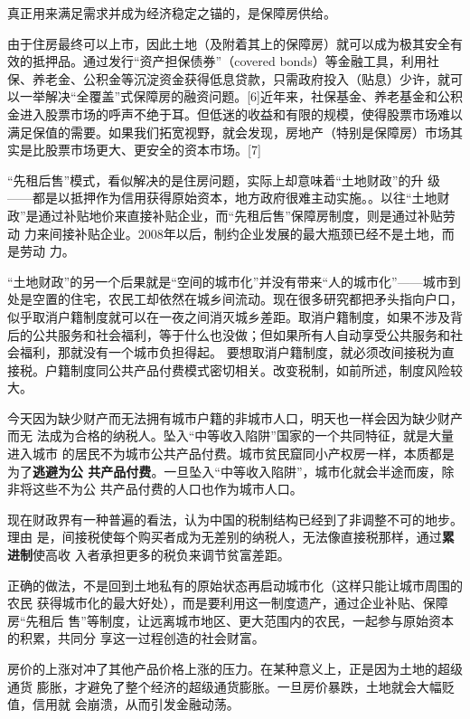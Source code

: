 真正用来满足需求并成为经济稳定之锚的，是保障房供给。

由于住房最终可以上市，因此土地（及附着其上的保障房）就可以成为极其安全有效的抵押品。通过发行“资产担保债券”（covered bonds）等金融工具，利用社保、养老金、公积金等沉淀资金获得低息贷款，只需政府投入（贴息）少许，就可以一举解决“全覆盖”式保障房的融资问题。[6]近年来，社保基金、养老基金和公积金进入股票市场的呼声不绝于耳。但低迷的收益和有限的规模，使得股票市场难以满足保值的需要。如果我们拓宽视野，就会发现，房地产（特别是保障房）市场其实是比股票市场更大、更安全的资本市场。[7]

“先租后售”模式，看似解决的是住房问题，实际上却意味着“土地财政”的升
级——都是以抵押作为信用获得原始资本，地方政府很难主动实施。。以往“土地财
政”是通过补贴地价来直接补贴企业，而“先租后售”保障房制度，则是通过补贴劳动
力来间接补贴企业。2008年以后，制约企业发展的最大瓶颈已经不是土地，而是劳动
力。

“土地财政”的另一个后果就是“空间的城市化”并没有带来“人的城市化”——城市到处是空置的住宅，农民工却依然在城乡间流动。现在很多研究都把矛头指向户口，似乎取消户籍制度就可以在一夜之间消灭城乡差距。取消户籍制度，如果不涉及背后的公共服务和社会福利，等于什么也没做；但如果所有人自动享受公共服务和社会福利，那就没有一个城市负担得起。
要想取消户籍制度，就必须改间接税为直接税。户籍制度同公共产品付费模式密切相关。改变税制，如前所述，制度风险较大。

今天因为缺少财产而无法拥有城市户籍的非城市人口，明天也一样会因为缺少财产而无
法成为合格的纳税人。坠入“中等收入陷阱”国家的一个共同特征，就是大量进入城市
的居民不为城市公共产品付费。城市贫民窟同小产权房一样，本质都是为了\textbf{逃避为公
  共产品付费}。一旦坠入“中等收入陷阱”，城市化就会半途而废，除非将这些不为公
共产品付费的人口也作为城市人口。

现在财政界有一种普遍的看法，认为中国的税制结构已经到了非调整不可的地步。理由
是，间接税使每个购买者成为无差别的纳税人，无法像直接税那样，通过\textbf{累进制}使高收
入者承担更多的税负来调节贫富差距。

正确的做法，不是回到土地私有的原始状态再启动城市化（这样只能让城市周围的农民
获得城市化的最大好处），而是要利用这一制度遗产，通过企业补贴、保障房“先租后
售”等制度，让远离城市地区、更大范围内的农民，一起参与原始资本的积累，共同分
享这一过程创造的社会财富。

房价的上涨对冲了其他产品价格上涨的压力。在某种意义上，正是因为土地的超级通货
膨胀，才避免了整个经济的超级通货膨胀。一旦房价暴跌，土地就会大幅贬值，信用就
会崩溃，从而引发金融动荡。

